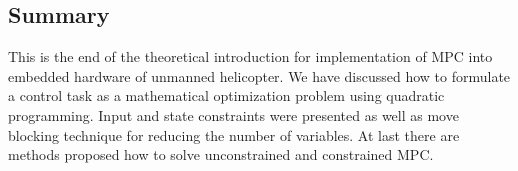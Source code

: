 \subsection{Summary}

This is the end of the theoretical introduction for implementation of MPC into embedded hardware of unmanned helicopter. We have discussed how to formulate a control task as a mathematical optimization problem using quadratic programming. Input and state constraints were presented as well as move blocking technique for reducing the number of variables. At last there are methods proposed how to solve unconstrained and constrained MPC.